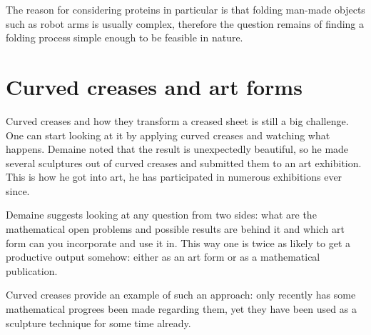 \documentclass[a4paper,12pt]{article}
\begin{document}
The reason for considering proteins in particular is that folding man-made objects such as robot arms is usually complex, therefore the question remains of finding a folding process simple enough to be feasible in nature.

\section{Curved creases and art forms}

Curved creases and how they transform a creased sheet is still a big challenge. One can start looking at it by applying curved creases and watching what happens. Demaine noted that the result is unexpectedly beautiful, so he made several sculptures out of curved creases and submitted them to an art exhibition. This is how he got into art, he has participated in numerous exhibitions ever since.

Demaine suggests looking at any question from two sides: what are the mathematical open problems and possible results are behind it and which art form can you incorporate and use it in. This way one is twice as likely to get a productive output somehow: either as an art form or as a mathematical publication.

Curved creases provide an example of such an approach: only recently has some mathematical progrees been made regarding them, yet they have been used as a sculpture technique for some time already.
\end{document}
